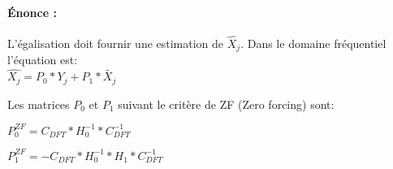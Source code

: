 \paragraph{Énonce :}


L'égalisation doit fournir une estimation de $\widehat{X_j}$. Dans le domaine
fréquentiel l'équation est:
~\\

$\widehat{X_j}= P_0*Y_j+P_1*\tilde{X_j}$

Les matrices $P_0$ et $P_1$ suivant le critère de ZF (Zero forcing) sont:

$P_0^{ZF} = C_{DFT}*H_0^{-1}*C_{DFT}^{-1}$

$P_1^{ZF} = - C_{DFT}*H_0^{-1}*H_1*C_{DFT}^{-1}$




